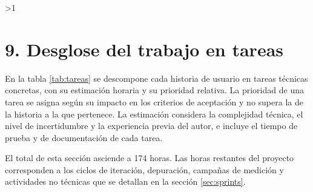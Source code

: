 \documentclass[
11pt, %
]{charter}
\providecommand{\revision}{1}
\begin{document}
\ifnum\revision>1
\section{9. Desglose del trabajo en tareas}
\label{sec:wbs}

En la tabla \ref{tab:tareas} se descompone cada historia de usuario en tareas técnicas concretas, con su estimación horaria y su prioridad relativa. La prioridad de una tarea se asigna según su impacto en los criterios de aceptación y no supera la de la historia a la que pertenece. La estimación considera la complejidad técnica, el nivel de incertidumbre y la experiencia previa del autor, e incluye el tiempo de prueba y de documentación de cada tarea.

El total de esta sección asciende a 174 horas. Las horas restantes del proyecto corresponden a los ciclos de iteración, depuración, campañas de medición y actividades no técnicas que se detallan en la sección \ref{sec:sprints}.
\end{document}
